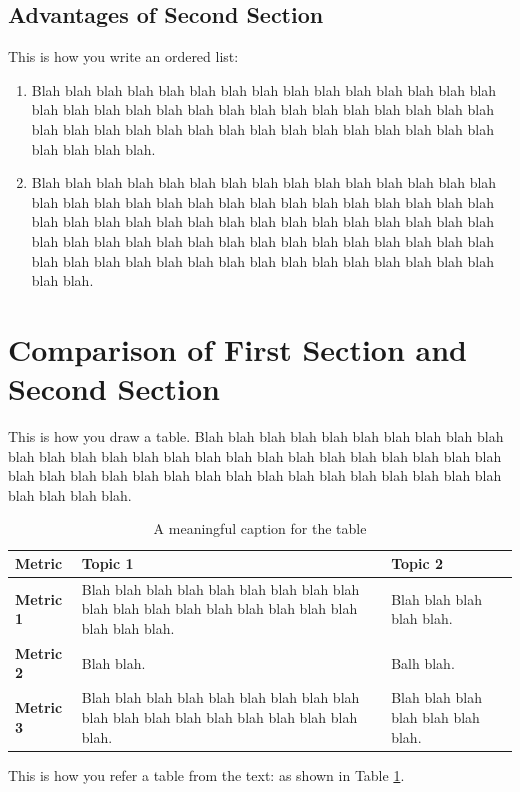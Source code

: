 \subsection{Advantages of Second Section}
This is how you write an ordered list:
\begin{enumerate}
\item Blah blah blah blah blah blah blah blah blah blah blah blah blah blah blah blah blah blah blah blah blah blah blah blah blah blah blah blah blah blah blah blah blah blah blah blah blah blah blah blah blah blah blah blah blah blah blah blah blah.

\item Blah blah blah blah blah blah blah blah blah blah blah blah blah blah blah blah blah blah blah blah blah blah blah blah blah blah blah blah blah blah blah blah blah blah blah blah blah blah blah blah blah blah blah blah blah blah blah blah blah blah blah blah blah blah blah blah blah blah blah blah blah blah blah blah blah blah blah blah blah blah blah blah blah blah blah blah blah.
\end{enumerate}

\section{Comparison of First Section and Second Section}
This is how you draw a table. Blah blah blah blah blah blah blah blah blah blah blah blah blah blah blah blah blah blah blah blah blah blah blah blah blah blah blah blah blah blah blah blah blah blah blah blah blah blah blah blah blah blah blah blah blah blah.
\begin{table}
\caption {A meaningful caption for the table}
\label{table:labelfortable}
\begin{tabularx}{\linewidth}{|X|X|X|}

\hline

\bf Metric &
\bf Topic 1 &
\bf Topic 2 \\ \hline

\bf Metric 1 &
Blah blah blah blah blah blah blah blah blah blah blah blah blah blah blah blah blah blah blah blah blah. &
Blah blah blah blah blah. \\ \hline

\bf Metric 2 &
Blah blah. &
Balh blah. \\ \hline

\bf Metric 3 &
Blah blah blah blah blah blah blah blah blah blah blah blah blah blah blah blah blah blah blah. &
Blah blah blah blah blah blah blah. \\ \hline

\end{tabularx}
\end{table}

This is how you refer a table from the text: as shown in Table \ref{table:labelfortable}.